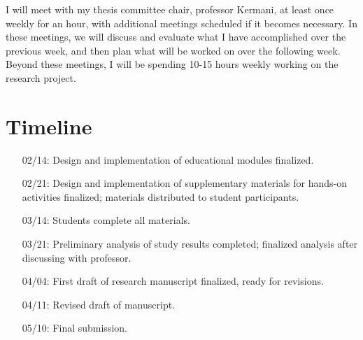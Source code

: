 \documentclass{article}
\begin{document}
    I will meet with my thesis committee chair, professor Kermani, at least once weekly for an hour, with additional meetings scheduled if it becomes necessary. %
In these meetings, we will discuss and evaluate what I have accomplished over the previous week, and then plan what will be worked on over the following week. %
Beyond these meetings, I will be spending 10-15 hours weekly working on the research project. %
     
\section{Timeline}

    \begin{itemize}
        \item [02/14:] Design and implementation of educational modules finalized.
        \item [02/21:] Design and implementation of supplementary materials for hands-on activities finalized; %
materials distributed to student participants.
        \item [03/14:] Students complete all materials.
        \item [03/21:] Preliminary analysis of study results completed; %
finalized analysis after discussing with professor.
        \item [04/04:] First draft of research manuscript finalized, ready for revisions.
        \item [04/11:] Revised draft of manuscript.
        \item [05/10:] Final submission.
    \end{itemize}
\end{document}
